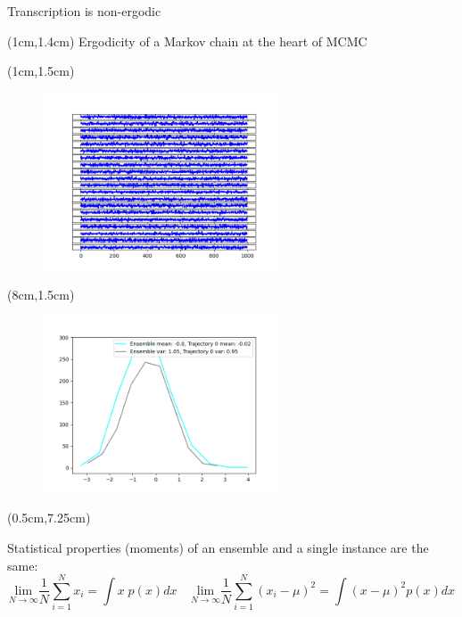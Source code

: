 \documentclass[aspectratio=1610]{beamer}					%
\begin{document}
\begin{frame}{Transcription is non-ergodic}
\begin{textblock*}{10cm}(1cm,1.4cm)
Ergodicity of a Markov chain at the heart of MCMC
\end{textblock*}

\begin{textblock*}{7cm}(1cm,1.5cm)
\begin{figure}
\includegraphics[width=7cm]{ergodic-1.png}
\end{figure}
\end{textblock*}

\begin{textblock*}{7cm}(8cm,1.5cm)
\begin{figure}
\includegraphics[width=7cm]{ergodic-2.png}
\end{figure}
\end{textblock*}

\begin{textblock*}{15cm}(0.5cm,7.25cm)

Statistical properties (moments) of an ensemble and a single instance are the same:
\begin{equation*}
\underset{N\rightarrow \infty}{\mathrm{lim}} \frac{1}{N}\sum_{i=1}^{N} x_{i} = \int x\; p(x)dx\;\;\;\;\underset{N\rightarrow \infty}{\mathrm{lim}} \frac{1}{N}\sum_{i=1}^{N} (x_{i}-\mu)^{2} = \int (x-\mu)^{2} p(x)dx
\end{equation*}
\end{textblock*}

\end{frame}
\end{document}
